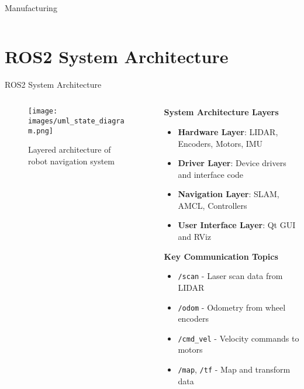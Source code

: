 \documentclass[aspectratio=169]{beamer}
\begin{document}
\begin{frame}{Manufacturing}
{\begin{columns}
			\hspace{-12em}

			\begin{column}{0.45\textwidth}
				\centering
			\end{column}
		\end{columns}
	}
\end{frame}

\section{ROS2 System Architecture}

\begin{frame}{ROS2 System Architecture}
	\begin{columns}
		\begin{column}{0.5\textwidth}
			\begin{figure}
				\centering
				\texttt{[image: images/uml\_state\_diagram.png]} %
				\caption{Layered architecture of robot navigation system}
			\end{figure}
		\end{column}
		\begin{column}{0.5\textwidth}
			\textbf{System Architecture Layers}
			\begin{itemize}
				\item \textbf{Hardware Layer}: LIDAR, Encoders, Motors, IMU
				\item \textbf{Driver Layer}: Device drivers and interface code
				\item \textbf{Navigation Layer}: SLAM, AMCL, Controllers
				\item \textbf{User Interface Layer}: Qt GUI and RViz
			\end{itemize}
			\vspace{0.5cm}
			\textbf{Key Communication Topics}
			\begin{itemize}
				\item \texttt{/scan} - Laser scan data from LIDAR
				\item \texttt{/odom} - Odometry from wheel encoders
				\item \texttt{/cmd\_vel} - Velocity commands to motors
				\item \texttt{/map}, \texttt{/tf} - Map and transform data
			\end{itemize}
		\end{column}
	\end{columns}
\end{frame}
\end{document}
